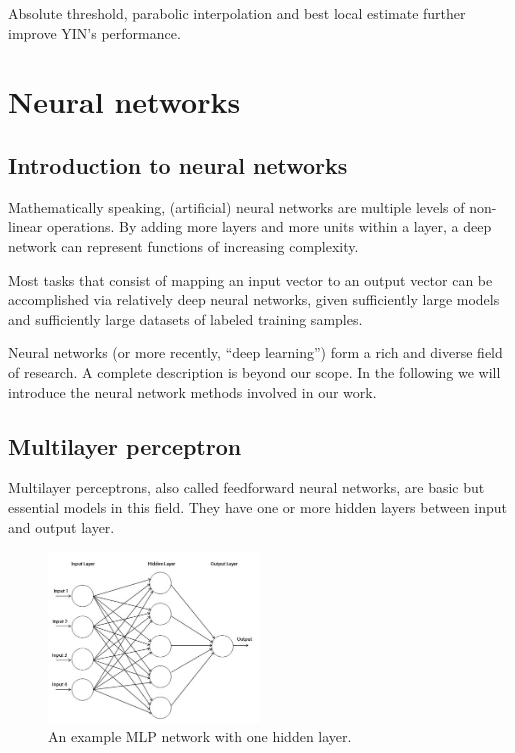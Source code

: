 \documentclass[11pt,a4paper]{report}
\begin{document}
Absolute threshold, parabolic interpolation and best local estimate further improve YIN's performance.

\section{Neural networks}

\subsection{Introduction to neural networks}

Mathematically speaking, (artificial) neural networks are multiple levels of non-linear operations.
By adding more layers and more units within a layer, a deep network can represent functions of increasing complexity.

Most tasks that consist of mapping an input vector to an output vector can be accomplished via relatively deep neural networks, given sufficiently large models and sufficiently large datasets of labeled training samples.

Neural networks (or more recently, \enquote{deep learning}) form a rich and diverse field of research.
A complete description is beyond our scope.
In the following we will introduce the neural network methods involved in our work.

\subsection{Multilayer perceptron}

Multilayer perceptrons, also called feedforward neural networks, are basic but essential models in this field.
They have one or more hidden layers between input and output layer.

\begin{figure}[htbp]
  \centering
  \includegraphics[width=0.5\textwidth]{mlp-example.jpg}
  \caption{An example MLP network with one hidden layer.} \label{fig:mlp-example}
\end{figure}
\end{document}
